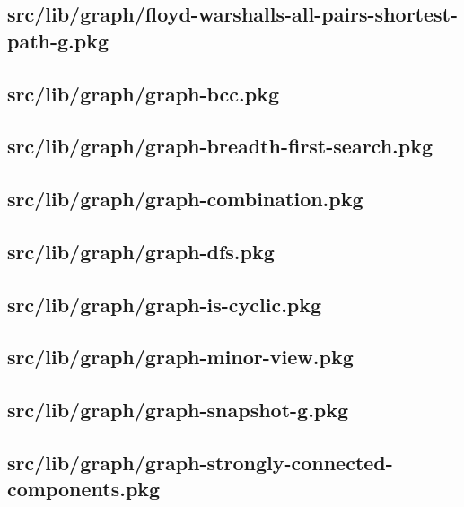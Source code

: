\subsection{src/lib/graph/floyd-warshalls-all-pairs-shortest-path-g.pkg}


\subsection{src/lib/graph/graph-bcc.pkg}


\subsection{src/lib/graph/graph-breadth-first-search.pkg}


\subsection{src/lib/graph/graph-combination.pkg}


\subsection{src/lib/graph/graph-dfs.pkg}


\subsection{src/lib/graph/graph-is-cyclic.pkg}


\subsection{src/lib/graph/graph-minor-view.pkg}


\subsection{src/lib/graph/graph-snapshot-g.pkg}


\subsection{src/lib/graph/graph-strongly-connected-components.pkg}


